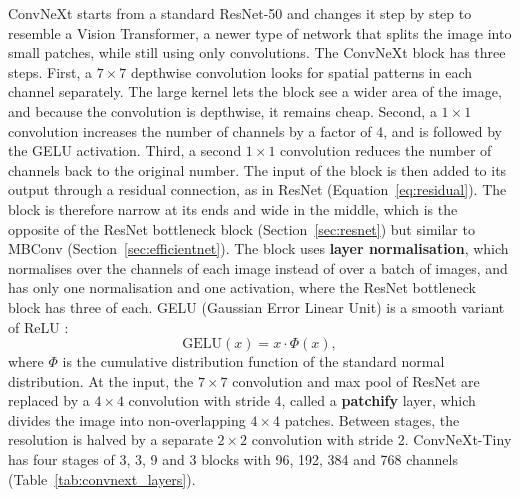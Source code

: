 ConvNeXt \citep{liu2022convnext} starts from a standard ResNet-50 and changes it step by step to resemble a Vision Transformer, a newer type of network that splits the image into small patches, while still using only convolutions. The ConvNeXt block has three steps. First, a $7\times7$ depthwise convolution looks for spatial patterns in each channel separately. The large kernel lets the block see a wider area of the image, and because the convolution is depthwise, it remains cheap. Second, a $1\times1$ convolution increases the number of channels by a factor of 4, and is followed by the GELU activation. Third, a second $1\times1$ convolution reduces the number of channels back to the original number. The input of the block is then added to its output through a residual connection, as in ResNet (Equation~\ref{eq:residual}). The block is therefore narrow at its ends and wide in the middle, which is the opposite of the ResNet bottleneck block (Section~\ref{sec:resnet}) but similar to MBConv (Section~\ref{sec:efficientnet}). The block uses \textbf{layer normalisation}, which normalises over the channels of each image instead of over a batch of images, and has only one normalisation and one activation, where the ResNet bottleneck block has three of each. GELU (Gaussian Error Linear Unit) is a smooth variant of ReLU \citep{hendrycks2016gelu}:
\begin{equation}
    \mathrm{GELU}(x) = x \cdot \Phi(x),
\label{eq:gelu}
\end{equation}
where $\Phi$ is the cumulative distribution function of the standard normal distribution. At the input, the $7\times7$ convolution and max pool of ResNet are replaced by a $4\times4$ convolution with stride 4, called a \textbf{patchify} layer, which divides the image into non-overlapping $4\times4$ patches. Between stages, the resolution is halved by a separate $2\times2$ convolution with stride 2. ConvNeXt-Tiny has four stages of 3, 3, 9 and 3 blocks with 96, 192, 384 and 768 channels (Table~\ref{tab:convnext_layers}).

